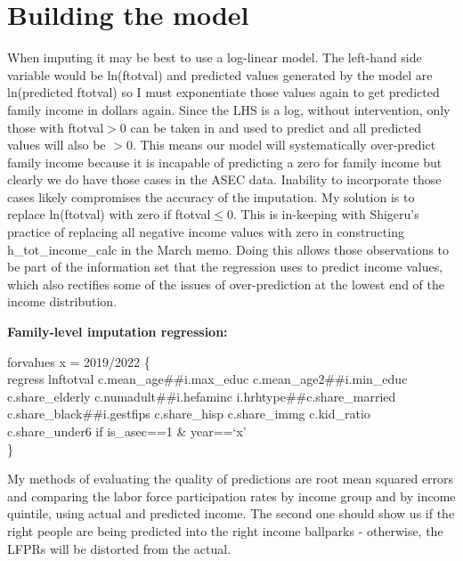 \documentclass{article}
\begin{document}
		\section{Building the model}
		When imputing it may be best to use a log-linear model. The left-hand side variable would be ln(ftotval) and predicted values generated by the model are ln(predicted ftotval) so I must exponentiate those values again to get predicted family income in dollars again. Since the LHS is a log, without intervention, only those with ftotval$>$0 can be taken in and used to predict and all predicted values will also be $>$0. This means our model will systematically over-predict family income because it is incapable of predicting a zero for family income but clearly we do have those cases in the ASEC data. Inability to incorporate those cases likely compromises the accuracy of the imputation. 	My solution is to replace ln(ftotval) with zero if ftotval$\le$0. This is in-keeping with Shigeru's practice of replacing all negative income values with zero in constructing h\_tot\_income\_calc in the March memo. Doing this allows those observations to be part of the information set that the regression uses to predict income values, which also rectifies some of the issues of over-prediction at the lowest end of the income distribution.
		
		
		\textbf{Family-level imputation regression:}
		
	forvalues x = 2019/2022 \{ \\
	regress lnftotval c.mean\_age\#\#i.max\_educ c.mean\_age2\#\#i.min\_educ c.share\_elderly c.numadult\#\#i.hefaminc i.hrhtype\#\#c.share\_married c.share\_black\#\#i.gestfips c.share\_hisp c.share\_immg c.kid\_ratio c.share\_under6  if is\_asec==1 \& year==`x' \\ \}
		
		My methods of evaluating the quality of predictions are root mean squared errors and comparing the labor force participation rates by income group and by income quintile, using actual and predicted income. The second one should show us if the right people are being predicted into the right income ballparks - otherwise, the LFPRs will be distorted from the actual.
		
\end{document}
